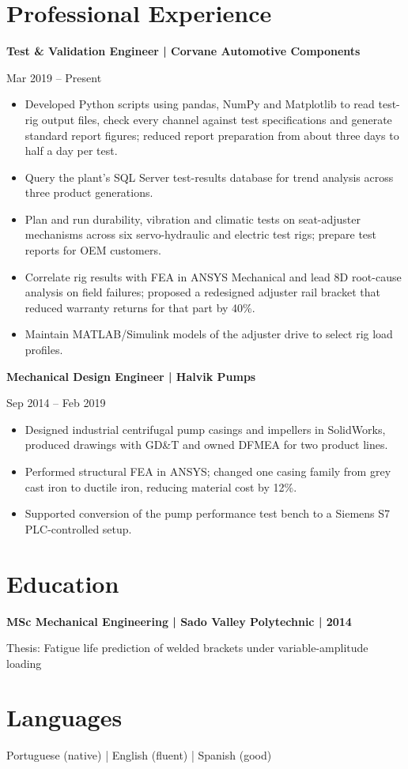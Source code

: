 \documentclass[11pt,a4paper]{article}
\newcommand{\cvsection}[1]{\section*{#1}}
\begin{document}
\cvsection{Professional Experience}
\textbf{Test \& Validation Engineer | Corvane Automotive Components}\par
Mar 2019 – Present
\begin{itemize}
\item Developed Python scripts using pandas, NumPy and Matplotlib to read test-rig output files, check every channel against test specifications and generate standard report figures; reduced report preparation from about three days to half a day per test.
\item Query the plant's SQL Server test-results database for trend analysis across three product generations.
\item Plan and run durability, vibration and climatic tests on seat-adjuster mechanisms across six servo-hydraulic and electric test rigs; prepare test reports for OEM customers.
\item Correlate rig results with FEA in ANSYS Mechanical and lead 8D root-cause analysis on field failures; proposed a redesigned adjuster rail bracket that reduced warranty returns for that part by 40\%.
\item Maintain MATLAB/Simulink models of the adjuster drive to select rig load profiles.
\end{itemize}
\textbf{Mechanical Design Engineer | Halvik Pumps}\par
Sep 2014 – Feb 2019
\begin{itemize}
\item Designed industrial centrifugal pump casings and impellers in SolidWorks, produced drawings with GD\&T and owned DFMEA for two product lines.
\item Performed structural FEA in ANSYS; changed one casing family from grey cast iron to ductile iron, reducing material cost by 12\%.
\item Supported conversion of the pump performance test bench to a Siemens S7 PLC-controlled setup.
\end{itemize}

\cvsection{Education}
\textbf{MSc Mechanical Engineering | Sado Valley Polytechnic | 2014}\par
Thesis: Fatigue life prediction of welded brackets under variable-amplitude loading

\cvsection{Languages}
Portuguese (native) | English (fluent) | Spanish (good)
\end{document}
